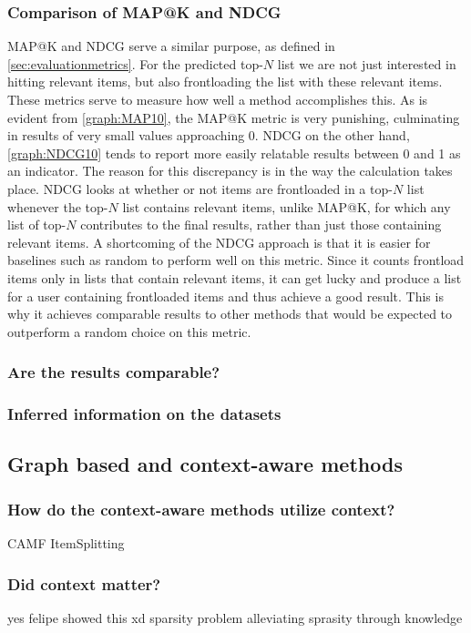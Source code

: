 \subsubsection{Comparison of MAP@K and NDCG}
MAP@K and NDCG serve a similar purpose, as defined in \autoref{sec:evaluationmetrics}.
For the predicted top-$N$ list we are not just interested in hitting relevant items, but also frontloading the list with these relevant items.
These metrics serve to measure how well a method accomplishes this.
As is evident from \autoref{graph:MAP10}, the MAP@K metric is very punishing, culminating in results of very small values approaching 0.
NDCG on the other hand, \autoref{graph:NDCG10} tends to report more easily relatable results between 0 and 1 as an indicator.
The reason for this discrepancy is in the way the calculation takes place.
NDCG looks at whether or not items are frontloaded in a top-$N$ list whenever the top-$N$ list contains relevant items, unlike MAP@K, for which any list of top-$N$ contributes to the final results, rather than just those containing relevant items.
A shortcoming of the NDCG approach is that it is easier for baselines such as random to perform well on this metric.
Since it counts frontload items only in lists that contain relevant items, it can get lucky and produce a list for a user containing frontloaded items and thus achieve a good result.
This is why it achieves comparable results to other methods that would be expected to outperform a random choice on this metric.
\subsubsection{Are the results comparable?}
\subsubsection{Inferred information on the datasets}

\subsection{Graph based and context-aware methods}
\subsubsection{How do the context-aware methods utilize context?}
CAMF 
ItemSplitting

\subsubsection{Did context matter?}
yes felipe showed this xd
sparsity problem
alleviating sprasity through knowledge

